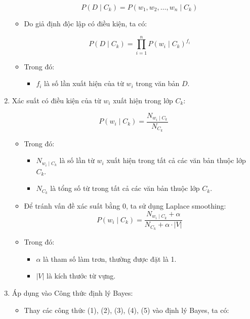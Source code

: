 \begin{enumerate}
\begin{itemize}
\[
P(D \mid C_k) = P(w_1, w_2, \dots, w_n \mid C_k)
\]

    \item Do giả định độc lập có điều kiện, ta có:

\[
P(D \mid C_k) = \prod_{i=1}^{n} P(w_i \mid C_k)^{f_i} \tag{3}
\]

    \item Trong đó:

\begin{itemize}
    \item \( f_i \) là số lần xuất hiện của từ \( w_i \) trong văn bản \( D \).
\end{itemize}
\end{itemize}
\clearpage
    \item Xác suất có điều kiện của từ \( w_i \) xuất hiện trong lớp \( C_k \):

\[
P(w_i \mid C_k) = \frac{N_{w_i \mid C_k}}{N_{C_k}} \tag{4}
\]
\begin{itemize}
    \item Trong đó:

\begin{itemize}
    \item \( N_{w_i \mid C_k} \) là số lần từ \( w_i \) xuất hiện trong tất cả các văn bản thuộc lớp \( C_k \).
    \item \( N_{C_k} \) là tổng số từ trong tất cả các văn bản thuộc lớp \( C_k \).
\end{itemize}

    \item Để tránh vấn đề xác suất bằng 0, ta sử dụng Laplace smoothing:
\[
P(w_i \mid C_k) = \frac{N_{w_i \mid C_k} + \alpha}{N_{C_k} + \alpha \cdot |V|} \tag{5}
\]

    \item Trong đó:

\begin{itemize}
    \item \( \alpha \) là tham số làm trơn, thường được đặt là 1.
    \item \( |V| \) là kích thước từ vựng.
\end{itemize}
\end{itemize}

     \item Áp dụng vào Công thức định lý Bayes:

\begin{itemize}
    \item Thay các công thức (1), (2), (3), (4), (5) vào định lý Bayes, ta có:


\end{itemize}
\end{enumerate}
